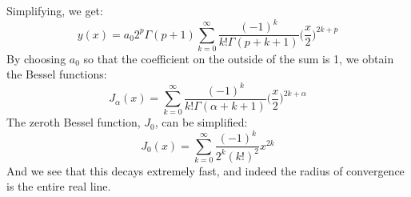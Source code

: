         Simplifying, we get:
        \begin{equation}
            y(x)=a_{0}2^{p}\Gamma(p+1)\sum_{k=0}^{\infty}
                \frac{(\minus{1})^{k}}{k!\Gamma(p+k+1)}
                \Big(\frac{x}{2}\Big)^{2k+p}
        \end{equation}
        By choosing $a_{0}$ so that the coefficient on the outside
        of the sum is 1, we obtain the Bessel functions:
        \begin{equation}
            J_{\alpha}(x)=\sum_{k=0}^{\infty}
            \frac{(\minus{1})^{k}}{k!\Gamma(\alpha+k+1)}
                \Big(\frac{x}{2}\Big)^{2k+\alpha}
        \end{equation}
        The zeroth Bessel function, $J_{0}$, can be simplified:
        \begin{equation}
            J_{0}(x)=\sum_{k=0}^{\infty}
                \frac{(\minus{1})^{k}}{2^{k}(k!)^{2}}x^{2k}
        \end{equation}
        And we see that this decays extremely fast, and indeed the
        radius of convergence is the entire real line.
